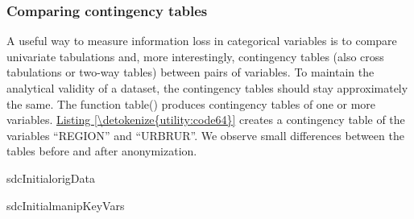 \documentclass[letterpaper,10pt,english]{sphinxmanual}
\begin{document}
\subsubsection{Comparing contingency tables}
\label{\detokenize{utility:comparing-contingency-tables}}
A useful way to measure information loss in categorical variables is to
compare univariate tabulations and, more interestingly, contingency
tables (also cross tabulations or two-way tables) between pairs of
variables. To maintain the analytical validity of a dataset, the
contingency tables should stay approximately the same. The function
table() produces contingency tables of one or more variables. \hyperref[\detokenize{utility:code64}]{Listing \ref{\detokenize{utility:code64}}}
creates a contingency table of the variables “REGION” and “URBRUR”.
We observe small differences between the tables before and after
anonymization.

\def\sphinxLiteralBlockLabel{\label{\detokenize{utility:code64}}}
%
\begin{sphinxVerbatim}[commandchars=\\\{\},numbers=left,firstnumber=1,stepnumber=1]
 sdcInitialorigData\PYG{p}{[}  \PYG{p}{]} 

 sdcInitialmanipKeyVars\PYG{p}{[}  \PYG{p}{]} 
\end{sphinxVerbatim}
\end{document}
